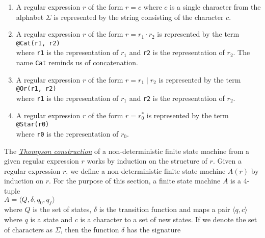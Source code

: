\begin{enumerate}
\item A regular expression $r$ of the form $r = c$ where $c$ is a single character from the alphabet $\Sigma$ is
      represented by the string consisting of the character $c$.
\item A regular expression $r$ of the form $r = r_1 \cdot r_2$ is represented by the term
      \\[0.2cm]
      \hspace*{1.3cm}
      \texttt{@Cat(r1, r2)}
      \\[0.2cm]
      where \texttt{r1} is the representation of $r_1$ and \texttt{r2} is the
      representation of $r_2$.  The name \texttt{Cat} reminds us of con\underline{cat}enation. 
\item A regular expression $r$ of the form $r = r_1 \mid r_2$ is represented by the term
      \\[0.2cm]
      \hspace*{1.3cm}
      \texttt{@Or(r1, r2)}
      \\[0.2cm]
      where \texttt{r1} is the representation of $r_1$ and \texttt{r2} is the
      representation of $r_2$.
\item A regular expression $r$ of the form $r = r_0^*$ is represented by the term
      \\[0.2cm]
      \hspace*{1.3cm}
      \texttt{@Star(r0)}
      \\[0.2cm]
      where \texttt{r0} is the representation of $r_0$. 
\end{enumerate}
The \href{https://en.wikipedia.org/wiki/Thompson%27s_construction_algorithm}{\emph{Thompson construction}}
of a non-deterministic finite state machine from a given regular 
expression $r$ works by induction on the structure of $r$.  Given a regular expression
$r$,  we define a non-deterministic finite state machine $A(r)$ by induction on $r$.
For the purpose of this section, a finite state machine $A$ is a 4-tuple
\\[0.2cm]
\hspace*{1.3cm}
$A = \langle Q, \delta, q_0, q_f \rangle$
\\[0.2cm]
where $Q$ is the set of states, 
$\delta$ is the transition function and maps a pair $\langle q, c \rangle$ where $q$ is a
state and $c$ is a character to a set of new states.  If we denote the set of characters
as $\Sigma$, then the function $\delta$ has the signature
\\[0.2cm]
\hspace*{1.3cm}
